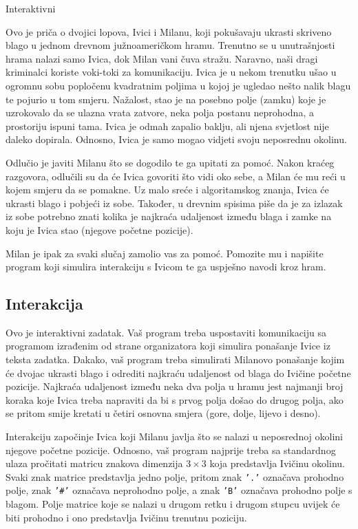 \begin{statement}[
  problempoints=100,
  timelimit=1 sekunda,
  memorylimit=512 MiB,
]{Interaktivni}

Ovo je priča o dvojici lopova, Ivici i Milanu, koji pokušavaju ukrasti skriveno
blago u jednom drevnom južnoameričkom hramu. Trenutno se u unutrašnjosti
hrama nalazi samo Ivica, dok Milan vani čuva stražu. Naravno, naši dragi
kriminalci koriste voki-toki za komunikaciju. Ivica je u nekom trenutku ušao
u ogromnu sobu popločenu kvadratnim poljima u kojoj je ugledao nešto nalik
blagu te pojurio u tom smjeru. Nažalost, stao je na posebno polje (zamku)
koje je uzrokovalo da se ulazna vrata zatvore, neka polja postanu neprohodna,
a prostoriju ispuni tama. Ivica je odmah zapalio baklju, ali njena svjetlost
nije daleko dopirala.  Odnosno, Ivica je samo mogao vidjeti svoju neposrednu
okolinu.

Odlučio je javiti Milanu što se dogodilo te ga upitati za pomoć. Nakon kraćeg
razgovora, odlučili su da će Ivica govoriti što vidi oko sebe, a Milan će mu
reći u kojem smjeru da se pomakne. Uz malo sreće i algoritamskog znanja, Ivica
će ukrasti blago i pobjeći iz sobe. Također, u drevnim spisima piše da je za
izlazak iz sobe potrebno znati kolika je najkraća udaljenost između blaga i
zamke na koju je Ivica stao (njegove početne pozicije).

Milan je ipak za svaki slučaj zamolio vas za pomoć. Pomozite mu i napišite
program koji simulira interakciju s Ivicom te ga uspješno navodi kroz hram.

\subsection*{Interakcija}
Ovo je interaktivni zadatak. Vaš program treba uspostaviti komunikaciju sa
programom izrađenim od strane organizatora koji simulira ponašanje Ivice iz
teksta zadatka. Dakako, vaš program treba simulirati Milanovo ponašanje kojim
će dvojac ukrasti blago i odrediti najkraću udaljenost od blaga do Ivičine
početne pozicije. Najkraća udaljenost između neka dva polja u hramu jest
najmanji broj koraka koje Ivica treba napraviti da bi s prvog polja došao do
drugog polja, ako se pritom smije kretati u četiri osnovna smjera (gore,
dolje, lijevo i desno).

Interakciju započinje Ivica koji Milanu javlja što se nalazi u neposrednoj
okolini njegove početne pozicije. Odnosno, vaš program najprije treba sa
standardnog ulaza pročitati matricu znakova dimenzija $3\times3$ koja
predstavlja Ivičinu okolinu. Svaki znak matrice predstavlja jedno polje,
pritom znak \texttt{'.'} označava prohodno polje, znak \texttt{'\#'} označava
neprohodno polje, a znak \texttt{'B'} označava prohodno polje s blagom. Polje
matrice koje se nalazi u drugom retku i drugom stupcu uvijek će biti prohodno
i ono predstavlja Ivičinu trenutnu poziciju.


\end{statement}
